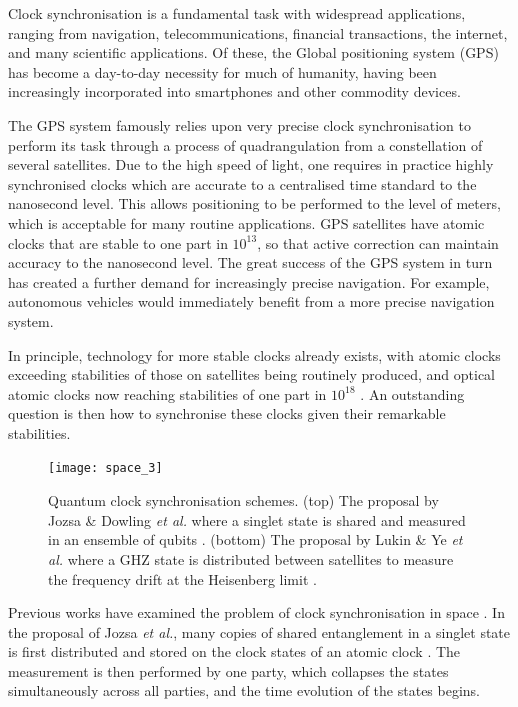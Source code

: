 Clock synchronisation is a fundamental task with widespread applications, ranging from navigation, telecommunications, financial transactions, the internet, and many scientific applications. Of these, the Global positioning system (GPS) has become a day-to-day necessity for much of humanity, having been increasingly incorporated into smartphones and other commodity devices.

The GPS system famously relies upon very precise clock synchronisation to perform its task through a process of quadrangulation from a constellation of several satellites. Due to the high speed of light, one requires in practice highly synchronised clocks which are accurate to a centralised time standard to the nanosecond level. This allows positioning to be performed to the level of meters, which is acceptable for many routine applications. GPS satellites have atomic clocks that are stable to one part in $10^{13}$, so that active correction can maintain accuracy to the nanosecond level. The great success of the GPS system in turn has created a further demand for increasingly precise navigation. For example, autonomous vehicles would immediately benefit from a more precise navigation system.

In principle, technology for more stable clocks already exists, with atomic clocks exceeding stabilities of those on satellites being routinely produced, and optical atomic clocks now reaching stabilities of one part in $10^{18}$ \cite{bib:ludlow2015optical}. An outstanding question is then how to synchronise these clocks given their remarkable stabilities. 

\begin{figure}[!htb]
\texttt{[image: space\_3]}
\caption{Quantum clock synchronisation schemes. (top) The proposal by Jozsa \& Dowling \textit{et al.} where a singlet state is shared and measured in an ensemble of qubits \cite{bib:jozsa00}. (bottom) The proposal by Lukin \& Ye \textit{et al.} where a GHZ state is distributed between satellites to measure the frequency drift at the Heisenberg limit \cite{bib:komar14}.}
\label{fig:space_3}
\end{figure}

Previous works have examined the problem of clock synchronisation in space . In the proposal of Jozsa \textit{et al.}, many copies of shared entanglement in a singlet state is first distributed and stored on the clock states of an atomic clock \cite{bib:jozsa00}. The measurement is then performed by one party, which collapses the states simultaneously across all parties, and the time evolution of the states begins.

